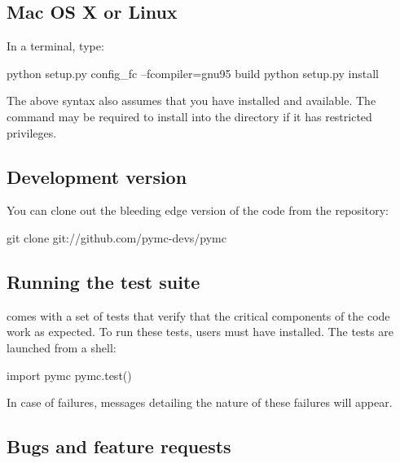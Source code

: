 \documentclass[]{jss}
\begin{document}
\subsection{Mac OS X or Linux}
  \label{mac-os-x-or-linux}%


In a terminal, type:
\begin{CodeInput}
python setup.py config_fc --fcompiler=gnu95 build
python setup.py install
\end{CodeInput}

The above syntax also assumes that you have  installed and available. The
 command may be required to install  into the  
directory if it has restricted privileges.



\subsection{Development version}
  \label{development-version}%


You can clone out the bleeding edge version of the code from the  \citep{git} 
repository:
\begin{CodeInput}
git clone git://github.com/pymc-devs/pymc
\end{CodeInput}



\subsection{Running the test suite}
  \label{running-the-test-suite}%


  comes with a set of tests that verify that the critical components
of the code work as expected. To run these tests, users must have 
installed. The tests are launched from a  shell:
\begin{CodeInput}
import pymc
pymc.test()
\end{CodeInput}

In case of failures, messages detailing the nature of these failures will
appear.



\subsection{Bugs and feature requests}
  \label{bugs-and-feature-requests}%
\end{document}

